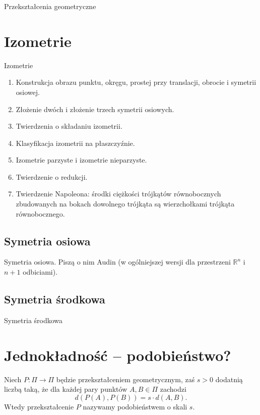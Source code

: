 Przekształcenia geometryczne

\section{Izometrie}
Izometrie

\begin{enumerate}
    \item Konstrukcja obrazu punktu, okręgu, prostej przy translacji, obrocie i symetrii osiowej.   
    \item Złożenie dwóch i złożenie trzech symetrii osiowych.
    \item Twierdzenia o składaniu izometrii. 
    \item Klasyfikacja izometrii na płaszczyźnie.
    \item Izometrie parzyste i izometrie nieparzyste.
    \item Twierdzenie o redukcji.  
    \item Twierdzenie Napoleona: środki ciężkości trójkątów równobocznych zbudowanych na bokach dowolnego trójkąta są wierzchołkami trójkąta równobocznego.  %
\end{enumerate}

\subsection{Symetria osiowa}
Symetria osiowa.
 
 
Piszą o nim Audin \cite[s. 49]{audin_2003} (w ogólniejszej wersji dla przestrzeni $\mathbb R^n$ i $n+1$ odbiciami).

\subsection{Symetria środkowa}
Symetria środkowa

\section{Jednokładność -- podobieństwo?}

\begin{definition}[podobieństwo]
    Niech $P \colon \Pi \to \Pi$ będzie przekształceniem geometrycznym, zaś $s > 0$ dodatnią liczbą taką, że dla każdej pary punktów $A, B \in \Pi$ zachodzi
    \begin{equation}
        d(P(A), P(B)) = s \cdot d(A, B).
    \end{equation}
    Wtedy przekształcenie $P$ nazywamy podobieństwem o skali $s$.
\end{definition}

